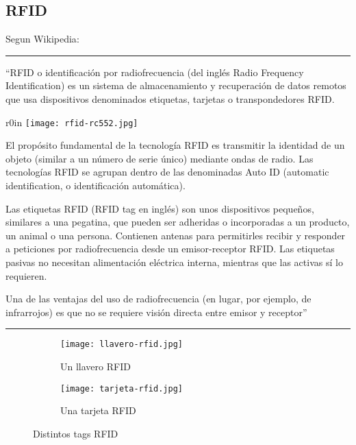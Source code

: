 \documentclass[../informe_krapp.tex]{subfiles}
\begin{document}
\clearpage
\subsection{RFID}
Segun Wikipedia\cite{wikipedia_rfid_es}:

\begin{center}
	\rule{0.8\textwidth}{0.3pt}
\end{center}
``RFID o identificación por radiofrecuencia
(del inglés Radio Frequency Identification) es un sistema de almacenamiento y recuperación
de datos remotos que usa dispositivos denominados etiquetas, tarjetas o transpondedores
RFID.

\begin{wrapfigure}{r}{0in}
	\centering
	\texttt{[image: rfid-rc552.jpg]}
\end{wrapfigure}

El propósito fundamental de la tecnología RFID es transmitir la identidad de
un objeto (similar a un número de serie único) mediante ondas de radio. Las tecnologías
RFID se agrupan dentro de las denominadas Auto ID (automatic identification,
o identificación automática).

Las etiquetas RFID (RFID tag en inglés) son unos dispositivos pequeños, similares
a una pegatina, que pueden ser adheridas o incorporadas a un producto, un animal
o una persona. Contienen antenas para permitirles recibir y responder a peticiones
por radiofrecuencia desde un emisor-receptor RFID. Las etiquetas pasivas no necesitan
alimentación eléctrica interna, mientras que las activas sí lo requieren.

Una de las ventajas del uso de radiofrecuencia (en lugar, por ejemplo, de infrarrojos)
es que no se requiere visión directa entre emisor y receptor''

\begin{center}
	\rule{0.8\textwidth}{0.3pt}
\end{center}

\begin{figure}[H]
	\centering
	\begin{subfigure}{0.4\textwidth}
		\texttt{[image: llavero-rfid.jpg]}
		\caption{Un llavero RFID}
	\end{subfigure}
	\begin{subfigure}{0.4\textwidth}
		\texttt{[image: tarjeta-rfid.jpg]}
		\caption{Una tarjeta RFID}
	\end{subfigure}
	\caption{Distintos tags RFID}
\end{figure}
\end{document}
